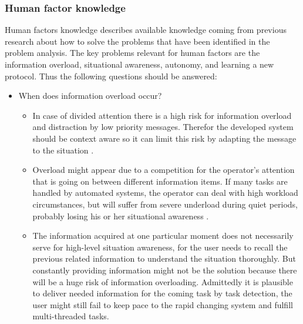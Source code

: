 \subsubsection{Human factor knowledge}
Human factors knowledge describes available knowledge coming from previous research about how to solve the problems that have been identified in the problem analysis. The key problems relevant for human factors are the information overload, situational awareness, autonomy, and learning a new protocol. Thus the following questions should be answered:
\begin{itemize}
	\item When does information overload occur?
	\begin{itemize}
		\item In case of divided attention there is a high risk for information overload and distraction by low priority messages. Therefor the developed system should be context aware so it can limit this risk by adapting the message to the situation \cite{Arimura2001}.
		\item Overload might appear due to a competition for the operator’s attention that is going on between different information items. If many tasks are handled by automated systems, the operator can deal with high workload circumstances, but will suffer from severe underload during quiet periods, probably losing his or her situational awareness \cite{Neerincx2008}.
		\item The information acquired at one particular moment does not necessarily serve for high-level situation awareness, for the user needs to recall the previous related information to understand the situation thoroughly. But constantly providing information might not be the solution because there will be a huge risk of information overloading. Admittedly it is plausible to deliver needed information for the coming task by task detection, the user might still fail to keep pace to the rapid changing system and fulfill multi-threaded tasks\cite{Porathe2014}.
	\end{itemize}
	

\end{itemize}
